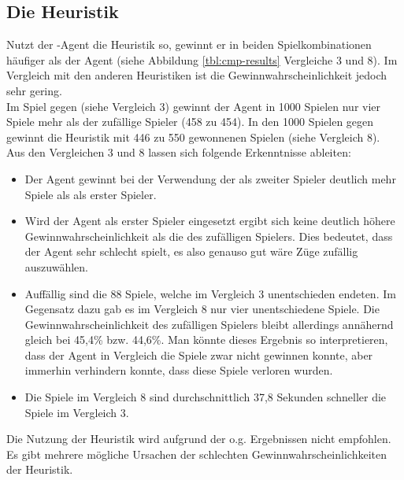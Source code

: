 \subsection{Die Heuristik }
\label{fz:h_smc}
Nutzt der -Agent die  Heuristik so, gewinnt er in beiden Spielkombinationen häufiger als der  Agent (siehe Abbildung \ref{tbl:cmp-results} Vergleiche 3 und 8). Im Vergleich mit den anderen Heuristiken ist die Gewinnwahrscheinlichkeit jedoch sehr gering.
\\Im Spiel  gegen  (siehe Vergleich 3) gewinnt der Agent in 1000 Spielen nur vier Spiele mehr als der zufällige Spieler (458 zu 454). In den 1000 Spielen  gegen  gewinnt die Heuristik mit 446 zu 550 gewonnenen Spielen (siehe Vergleich 8).
\\Aus den Vergleichen 3 und 8 lassen sich folgende Erkenntnisse ableiten:
\begin{itemize}
\item Der Agent  gewinnt bei der Verwendung der  als zweiter Spieler deutlich mehr Spiele als als erster Spieler.
\item Wird der Agent als erster Spieler eingesetzt ergibt sich keine deutlich höhere Gewinnwahrscheinlichkeit als die des zufälligen Spielers. Dies bedeutet, dass der Agent sehr schlecht spielt, es also genauso gut wäre Züge zufällig auszuwählen. 
\item Auffällig sind die 88 Spiele, welche im Vergleich 3 unentschieden endeten. Im Gegensatz dazu gab es im Vergleich 8 nur vier unentschiedene Spiele. Die Gewinnwahrscheinlichkeit des zufälligen Spielers bleibt allerdings annähernd gleich bei 45,4\% bzw. 44,6\%. Man könnte dieses Ergebnis so interpretieren, dass der Agent in Vergleich die Spiele zwar nicht gewinnen konnte, aber immerhin verhindern konnte, dass diese Spiele verloren wurden.
\item Die Spiele im Vergleich 8 sind durchschnittlich 37,8 Sekunden schneller die Spiele im Vergleich 3.
\end{itemize}
Die Nutzung der Heuristik  wird aufgrund der o.g. Ergebnissen nicht empfohlen.
\\Es gibt mehrere mögliche Ursachen der schlechten Gewinnwahrscheinlichkeiten der Heuristik.
\vspace{0.5cm}
